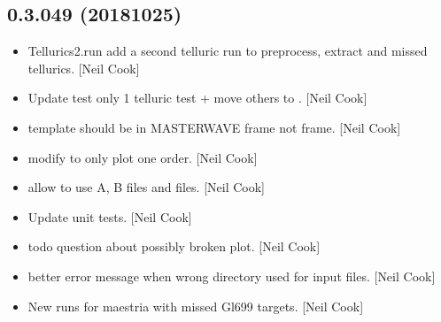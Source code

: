 \documentclass[a4paper,10pt,english]{report}
\begin{document}
\subsection{0.3.049 (2018\sphinxhyphen{}10\sphinxhyphen{}25)}
\label{\detokenize{misc/changelog:id301}}\begin{itemize}
\item {} 
Tellurics2.run \sphinxhyphen{} add a second telluric run \sphinxhyphen{} to preprocess, extract
and  missed tellurics. {[}Neil Cook{]}

\item {} 
Update test \sphinxhyphen{} only 1 telluric test + move others to . {[}Neil
Cook{]}

\item {} 
 \sphinxhyphen{} template should be in MASTERWAVE frame not 
frame. {[}Neil Cook{]}

\item {} 
 \sphinxhyphen{} modify  to only plot one
order. {[}Neil Cook{]}

\item {} 
 \sphinxhyphen{} allow  to use A, B files
and  files. {[}Neil Cook{]}

\item {} 
Update unit tests. {[}Neil Cook{]}

\item {} 
 \sphinxhyphen{} todo question about possibly broken plot. {[}Neil
Cook{]}

\item {} 
 \sphinxhyphen{} better error message when wrong directory used for
input files. {[}Neil Cook{]}

\item {} 
New  runs for maestria with missed Gl699 targets. {[}Neil Cook{]}

\end{itemize}
\end{document}
